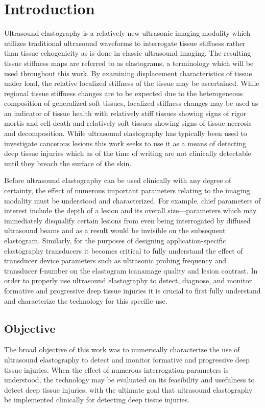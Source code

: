 \chapter{Introduction}
	Ultrasound elastography is a relatively new ultrasonic imaging modality which utilizes traditional ultrasound waveforms to interrogate tissue stiffness rather than tissue echogenicity as is done in classic ultrasound imaging. The resulting tissue stiffness maps are referred to as elastograms, a terminology which will be used throughout this work. By examining displacement characteristics of tissue under load, the relative localized stiffness of the tissue may be ascertained. While regional tissue stiffness changes are to be expected due to the heterogeneous composition of generalized soft tissues, localized stiffness changes may be used as an indicator of tissue health \cite{gefen09} with relatively stiff tissues showing signs of rigor mortis and cell death and relatively soft tissues showing signs of tissue necrosis and decomposition. While ultrasound elastography has typically been used to investigate cancerous lesions this work seeks to use it as a means of detecting deep tissue injuries which as of the time of writing are not clinically detectable until they breach the surface of the skin.

	Before ultrasound elastography can be used clinically with any degree of certainty, the effect of numerous important parameters relating to the imaging modality must be understood and characterized. For example, chief parameters of interest include the depth of a lesion and its overall size---parameters which may immediately disqualify certain lesions from even being interrogated by diffused ultrasound beams and as a result would be invisible on the subsequent elastogram. Similarly, for the purposes of designing application-specific elastography transducers it becomes critical to fully understand the effect of transducer device parameters such as ultrasonic probing frequency and transducer f-number on the elastogram icanamage quality and lesion contrast. In order to properly use ultrasound elastography to detect, diagnose, and monitor formative and progressive deep tissue injuries it is crucial to first fully understand and characterize the technology for this specific use.

	\section{Objective}
		The broad objective of this work was to numerically characterize the use of ultrasound elastography to detect and monitor formative and progressive deep tissue injuries. When the effect of numerous interrogation parameters is understood, the technology may be evaluated on its feasibility and usefulness to detect deep tissue injuries, with the ultimate goal that ultrasound elastography be implemented clinically for detecting deep tissue injuries.

